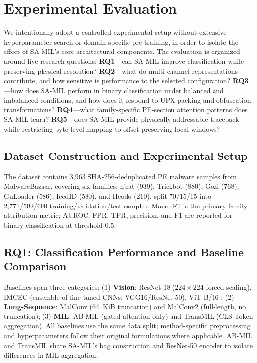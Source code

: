 \documentclass[runningheads]{llncs}
\begin{document}
\section{Experimental Evaluation}
\label{sec:evaluation}

We intentionally adopt a controlled experimental setup without extensive hyperparameter search or domain-specific pre-training, in order to isolate the effect of SA-MIL's core architectural components. The evaluation is organized around five research questions: \textbf{RQ1}---can SA-MIL improve classification while preserving physical resolution? \textbf{RQ2}---what do multi-channel representations contribute, and how sensitive is performance to the selected configuration? \textbf{RQ3}---how does SA-MIL perform in binary classification under balanced and imbalanced conditions, and how does it respond to UPX packing and obfuscation transformations? \textbf{RQ4}---what family-specific PE-section attention patterns does SA-MIL learn? \textbf{RQ5}---does SA-MIL provide physically addressable traceback while restricting byte-level mapping to offset-preserving local windows?

\subsection{Dataset Construction and Experimental Setup}
\label{subsec:exp_setup}

The dataset contains 3,963 SHA-256-deduplicated PE malware samples from MalwareBazaar, covering six families: njrat (939), Trickbot (880), Gozi (768), GuLoader (586), IcedID (580), and Heodo (210), split 70/15/15 into 2,771/592/600 training/validation/test samples. Macro-F1 is the primary family-attribution metric; AUROC, FPR, TPR, precision, and F1 are reported for binary classification at threshold 0.5.

\subsection{RQ1: Classification Performance and Baseline Comparison}
\label{subsec:rq1_performance}
Baselines span three categories: (1) \textbf{Vision}: ResNet-18 ($224\times224$ forced scaling), IMCEC \cite{vasan2020image} (ensemble of fine-tuned CNNs: VGG16/ResNet-50), ViT-B/16 \cite{dosovitskiy2020image}; (2) \textbf{Long-Sequence}: MalConv \cite{raff2017malware} (64~KiB truncation) and MalConv2 \cite{raff2021classifying} (full-length, no truncation); (3) \textbf{MIL}: AB-MIL \cite{ilse2018attention} (gated attention only) and TransMIL \cite{shao2021transmil} (CLS-Token aggregation). All baselines use the same data split; method-specific preprocessing and hyperparameters follow their original formulations where applicable. AB-MIL and TransMIL share SA-MIL's bag construction and ResNet-50 encoder to isolate differences in MIL aggregation.
\end{document}
